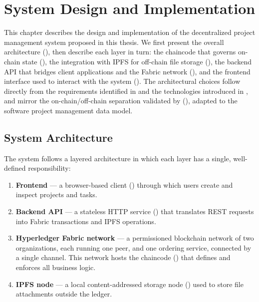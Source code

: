 \chapter{System Design and Implementation}
\label{ch:method}

This chapter describes the design and implementation of the decentralized project management system proposed in this thesis. We first present the overall architecture (), then describe each layer in turn: the chaincode that governs on-chain state (), the integration with IPFS for off-chain file storage (), the backend API that bridges client applications and the Fabric network (), and the frontend interface used to interact with the system (). The architectural choices follow directly from the requirements identified in  and the technologies introduced in , and mirror the on-chain/off-chain separation validated by \textcite{adel2023} (), adapted to the software project management data model.

\section{System Architecture}
\label{sec:architecture}

The system follows a layered architecture in which each layer has a single, well-defined responsibility:

\begin{enumerate}
    \item \textbf{Frontend} — a browser-based client () through which users create and inspect projects and tasks.
    \item \textbf{Backend API} — a stateless HTTP service () that translates REST requests into Fabric transactions and IPFS operations.
    \item \textbf{Hyperledger Fabric network} — a permissioned blockchain network of two organizations, each running one peer, and one ordering service, connected by a single channel. This network hosts the chaincode () that defines and enforces all business logic.
    \item \textbf{IPFS node} — a local content-addressed storage node () used to store file attachments outside the ledger.
\end{enumerate}

